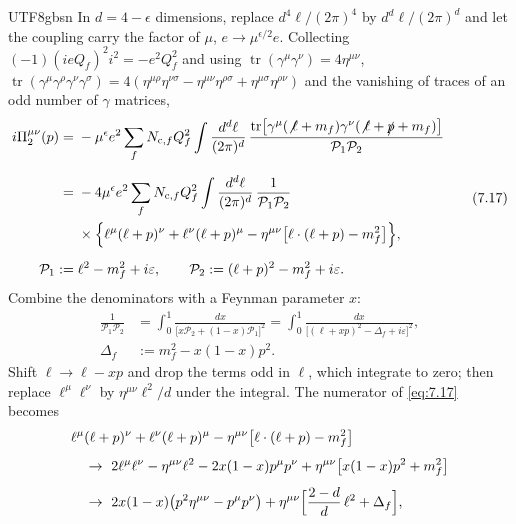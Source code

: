 \documentclass[11pt,a4paper,oneside]{report}
\begin{document}
\begin{CJK*}{UTF8}{gbsn}
In $d=4-\epsilon$ dimensions, replace $d^4\ell/(2\pi)^4$ by $d^d\ell/(2\pi)^d$ and let the coupling carry the factor of $\mu$, $e\to\mu^{\epsilon/2}e$. Collecting $(-1)(ieQ_f)^2i^2=-e^2Q_f^2$ and using $\operatorname{tr}(\gamma^\mu\gamma^\nu)=4\eta^{\mu\nu}$, $\operatorname{tr}(\gamma^\mu\gamma^\rho\gamma^\nu\gamma^\sigma)=4(\eta^{\mu\rho}\eta^{\nu\sigma}-\eta^{\mu\nu}\eta^{\rho\sigma}+\eta^{\mu\sigma}\eta^{\rho\nu})$ and the vanishing of traces of an odd number of $\gamma$ matrices,
\begin{equation*}
\begin{aligned}
i\Pi_2^{\mu\nu}(p)
={}&-\mu^{\epsilon}e^2\sum_fN_{\mathrm c,f}Q_f^2\int\frac{d^d\ell}{(2\pi)^d}\,
\frac{\operatorname{tr}\bigl[\gamma^\mu(\not\ell+m_f)\gamma^\nu(\not\ell+\slashed{p}+m_f)\bigr]}{\mathcal P_1\mathcal P_2}\\[6pt]
={}&-4\mu^{\epsilon}e^2\sum_fN_{\mathrm c,f}Q_f^2\int\frac{d^d\ell}{(2\pi)^d}\,\frac{1}{\mathcal P_1\mathcal P_2}\\
&\times\Bigl\{\ell^\mu(\ell+p)^\nu+\ell^\nu(\ell+p)^\mu-\eta^{\mu\nu}\bigl[\ell\cdot(\ell+p)-m_f^2\bigr]\Bigr\},\\[6pt]
\mathcal P_1:={}&\ell^2-m_f^2+i\varepsilon,\qquad
\mathcal P_2:=(\ell+p)^2-m_f^2+i\varepsilon .
\end{aligned}
\tag{7.17}\label{eq:7.17}
\end{equation*}
Combine the denominators with a Feynman parameter $x$:
\begin{equation*}
\begin{aligned}
\frac{1}{\mathcal P_1\mathcal P_2}
&=\int_0^1\frac{dx}{\bigl[x\mathcal P_2+(1-x)\mathcal P_1\bigr]^2}
=\int_0^1\frac{dx}{\bigl[(\ell+xp)^2-\Delta_f+i\varepsilon\bigr]^2},\\[6pt]
\Delta_f&:=m_f^2-x(1-x)p^2 .
\end{aligned}
\tag{7.18}\label{eq:7.18}
\end{equation*}
Shift $\ell\to\ell-xp$ and drop the terms odd in $\ell$, which integrate to zero; then replace $\ell^\mu\ell^\nu$ by $\eta^{\mu\nu}\ell^2/d$ under the integral. The numerator of \eqref{eq:7.17} becomes
\begin{equation*}
\begin{aligned}
&\ell^\mu(\ell+p)^\nu+\ell^\nu(\ell+p)^\mu-\eta^{\mu\nu}\bigl[\ell\cdot(\ell+p)-m_f^2\bigr]\\[4pt]
&\quad\to\ 2\ell^\mu\ell^\nu-\eta^{\mu\nu}\ell^2-2x(1-x)p^\mu p^\nu+\eta^{\mu\nu}\bigl[x(1-x)p^2+m_f^2\bigr]\\[4pt]
&\quad\to\ 2x(1-x)\bigl(p^2\eta^{\mu\nu}-p^\mu p^\nu\bigr)+\eta^{\mu\nu}\Bigl[\frac{2-d}{d}\,\ell^2+\Delta_f\Bigr],

\end{aligned}
\end{equation*}
\end{CJK*}
\end{document}
